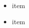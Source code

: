 \begin{itemize}
\setlength{\itemsep}{0pt}
\setlength{\parskip}{0pt}
\item
item\par
\item
item\par
\end{itemize}
